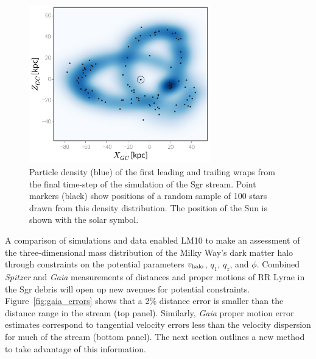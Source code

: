 \begin{figure}[h]
\begin{center}
\includegraphics[width=0.7\textwidth]{figures/ch1/fig2.pdf}
\caption{ Particle density (blue) of the first leading and trailing wraps from the final time-step of the \citet{law10} simulation of the Sgr stream. Point markers (black) show positions of a random sample of 100 stars drawn from this density distribution. The position of the Sun is shown with the solar symbol. }\label{fig:lm10}
\end{center}
\end{figure}

A comparison of simulations and data enabled LM10 to make an assessment of the three-dimensional 
mass distribution of the Milky Way's dark matter
halo through constraints on the potential parameters $v_{\rm halo}$, $q_1$, $q_z$, and $\phi$. Combined {\it Spitzer} and {\it Gaia} measurements of distances and proper motions
of RR Lyrae in the Sgr debris will open up new avenues for potential constraints. Figure~\ref{fig:gaia_errors} shows that a 2\% distance error is smaller than the 
distance range in the stream (top panel). Similarly, {\it Gaia} proper motion
error estimates correspond to tangential velocity errors less than the velocity
dispersion for much of the stream (bottom panel). The next section outlines a 
new method to take advantage of this information. 


